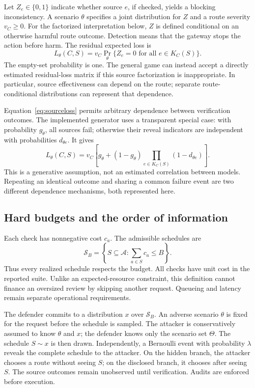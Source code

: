 \documentclass[11pt,letterpaper]{article}
\begin{document}
Let $Z_e\in\{0,1\}$ indicate whether source $e$, if checked, yields a blocking inconsistency. A scenario $\theta$ specifies a joint distribution for $Z$ and a route severity $v_C\geq0$. For the factorized interpretation below, $Z$ is defined conditional on an otherwise harmful route outcome. Detection means that the gateway stops the action before harm. The residual expected loss is
\begin{equation}
L_\theta(C,S)=v_C\Pr_\theta\{Z_e=0\text{ for all }e\in K_C(S)\}.
\label{eq:sourceloss}
\end{equation}
The empty-set probability is one. The general game can instead accept a directly estimated residual-loss matrix if this source factorization is inappropriate. In particular, source effectiveness can depend on the route; separate route-conditional distributions can represent that dependence.

Equation~\ref{eq:sourceloss} permits arbitrary dependence between verification outcomes. The implemented generator uses a transparent special case: with probability $g_\theta$, all sources fail; otherwise their reveal indicators are independent with probabilities $d_{\theta e}$. It gives
\begin{equation}
L_\theta(C,S)=v_C\left[g_\theta+(1-g_\theta)
\prod_{e\in K_C(S)}(1-d_{\theta e})\right].
\label{eq:mixture}
\end{equation}
This is a generative assumption, not an estimated correlation between models. Repeating an identical outcome and sharing a common failure event are two different dependence mechanisms, both represented here.

\subsection{Hard budgets and the order of information}

Each check has nonnegative cost $c_a$. The admissible schedules are
\begin{equation}
\mathcal S_B=\left\{S\subseteq\mathcal A:\sum_{a\in S}c_a\leq B\right\}.
\label{eq:hardbudget}
\end{equation}
Thus every realized schedule respects the budget. All checks have unit cost in the reported suite. Unlike an expected-resource constraint, this definition cannot finance an oversized review by skipping another request. Queueing and latency remain separate operational requirements.

The defender commits to a distribution $x$ over $\mathcal S_B$. An adverse scenario $\theta$ is fixed for the request before the schedule is sampled. The attacker is conservatively assumed to know $\theta$ and $x$; the defender knows only the scenario set $\Theta$. The schedule $S\sim x$ is then drawn. Independently, a Bernoulli event with probability $\lambda$ reveals the complete schedule to the attacker. On the hidden branch, the attacker chooses a route without seeing $S$; on the disclosed branch, it chooses after seeing $S$. The source outcomes remain unobserved until verification. Audits are enforced before execution.
\end{document}
